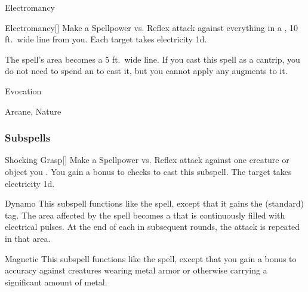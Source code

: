 \newpage
\begin{spellsection}{Electromancy}

\begin{spellheader}
\end{spellheader}


\begin{ability}{Electromancy}[]
Make a Spellpower vs. Reflex attack against everything in a \arealarge, 10 ft.\ wide line from you.
\hit Each target takes electricity  \minus1d.
\end{ability}



 The spell's area becomes a 5 ft.\ wide \areamed line. If you cast this spell as a cantrip,
you do not need to spend an  to cast it,
but you cannot apply any augments to it.


 Evocation

 Arcane, Nature
\end{spellsection}


\subsubsection{Subspells}


\begin{ability}[\nth{1}]{Shocking Grasp}[]
Make a Spellpower vs. Reflex attack against one creature or object you .
You gain a  bonus to  checks to cast this subspell.
\hit The target takes electricity  \plus1d.
\end{ability}
\vspace{0.25em}


\begin{ability}[\nth{2}]{Dynamo}
This subspell functions like the  spell, except that it gains the  (standard) tag.
The area affected by the spell becomes a  that is continuously filled with electrical pulses.
At the end of each  in subsequent rounds, the attack is repeated in that area.
\end{ability}
\vspace{0.25em}


\begin{ability}[\nth{2}]{Magnetic}
This subspell functions like the  spell, except that you gain a  bonus to accuracy against creatures wearing metal armor or otherwise carrying a significant amount of metal.
\end{ability}
\vspace{0.25em}


